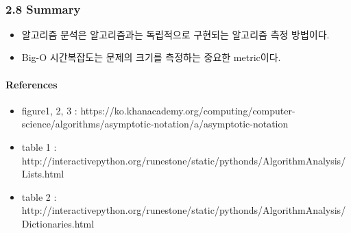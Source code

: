 \documentclass[11pt]{article}
\providecommand{\tightlist}{%
      \setlength{\itemsep}{0pt}\setlength{\parskip}{0pt}}
\begin{document}
    \begin{center}
    \end{center}
    { \hspace*{\fill} \\}
    
    \subsubsection{2.8 Summary}\label{summary}

    \begin{itemize}
\tightlist
\item
  알고리즘 분석은 알고리즘과는 독립적으로 구현되는 알고리즘 측정
  방법이다.
\item
  Big-O 시간복잡도는 문제의 크기를 측정하는 중요한 metric이다.
\end{itemize}

    \paragraph{References}\label{references}

\begin{itemize}
\tightlist
\item
  figure1, 2, 3 :
  https://ko.khanacademy.org/computing/computer-science/algorithms/asymptotic-notation/a/asymptotic-notation
\item
  table 1 :
  http://interactivepython.org/runestone/static/pythonds/AlgorithmAnalysis/Lists.html
\item
  table 2 :
  http://interactivepython.org/runestone/static/pythonds/AlgorithmAnalysis/Dictionaries.html
\end{itemize}


    
    
    
    
\end{document}

